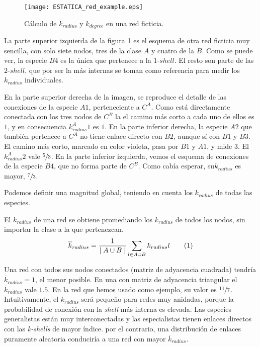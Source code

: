 \begin{figure}[h!]
\centering
\texttt{[image: ESTATICA\_red\_example.eps]}
\caption {Cálculo de \textit{$k_{radius}$} y  \textit{$k_{degree}$} en una red ficticia.}
\label{fig:ESTATICA_red_example}
\end{figure}

La parte superior izquierda de la figura \ref{fig:ESTATICA_red_example} es el esquema de otra red ficticia muy sencilla, con solo siete nodos, tres de la clase $A$ y cuatro de la $B$. Como se puede ver,  la especie $B4$ es la única que pertenece a la $1$-$shell$. El resto son parte de las $2$-$shell$, que por ser la más internas se toman como referencia para medir los $k_{radius}$ individuales. 

En la parte superior derecha de la imagen, se reproduce el detalle de las conexiones de la especie $A1$, perteneciente a $C^{A}$.  Como está directamente conectada con los tres nodos de $C^{B}$ la el camino más corto a cada uno de ellos es $1$, y en consecuencia $k^A_{radius}1$ es $1$. En la parte inferior derecha, la especie $A2$ que también pertenece a $C^{A}$ no tiene enlace directo con $B2$, aunque sí con $B1$ y $B3$. El camino más corto, marcado en color violeta, pasa por $B1$ y $A1$, y mide $3$. El $k^A_{radius}2$ vale $\sfrac{5}{3}$. En la parte inferior izquierda, vemos el esquema de conexiones de la especie $B4$, que no forma parte de $C^{B}$. Como cabía esperar, su$k_{radius}$ es mayor, $\sfrac{7}{3}$. 

Podemos definir una magnitud global, teniendo en cuenta los $k_{radius}$ de todas las especies.

\begin{theo} 
El \textit{$\overline k_{radius}$} de una red se obtiene promediando los ${k}_{radius}$ de todos los nodos, sin importar la clase a la que pertenezcan.
\begin{align*}
\displaystyle
\overline {k}_{radius} = \frac{1}{\mid A \cup B \mid}\sum\limits_{l \in A \cup B} k_{radius}l
\stepcounter{equation}\tag{\theequation}\label{avgkradius}
\end{align*}
\label{ESTATICA_avgkradius}
\end{theo}

Una red con todos sus nodos conectados (matriz de adyacencia cuadrada) tendría $\overline {k}_{radius}=1$, el menor posible. En una con matriz de adyacencia triangular el $\overline {k}_{radius}$ vale $1.5$. En la red que hemos usado como ejemplo, su valor es $\sfrac{11}{7}$. Intuitivamente, el $\overline {k}_{radius}$ será pequeño para redes muy anidadas, porque la probabilidad de conexión con la \textit{shell} más interna es elevada. Las especies generalistas están muy interconectadas y las especialistas tienen enlaces directos con las \textit{k-shells} de mayor índice. por el contrario, una distribución de enlaces puramente aleatoria conduciría a una red con mayor $\overline {k}_{radius}$.

